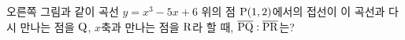 \noindent\begin{minipage}[t]{0.58\linewidth}\vspace{0pt}\raggedright 오른쪽 그림과 같이 곡선 $y=x^3-5x+6$ 위의 점 $\mathrm{P}(1{,}\mkern3mu\mathopen{}2)$에서의 접선이 이 곡선과 다시 만나는 점을 $\mathrm{Q}$, $x$축과 만나는 점을 $\mathrm{R}$라 할 때, $\overline{\mathrm{PQ}}:\overline{\mathrm{PR}}$는?\end{minipage}\hfill\begin{minipage}[t]{0.4\linewidth}\vspace{0pt}\centering \resizebox{\ifdim\width>\linewidth\linewidth\else\width\fi}{!}{}\end{minipage}\par
{}
